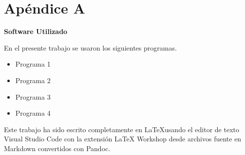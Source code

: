 \chapter*{Apéndice A} %

\linespread{1.3}

\noindent \textbf{\large{Software Utilizado}}
\ \newline
\par

En el presente trabajo se usaron los siguientes programas.

\begin{itemize}
	\item Programa 1
	\item Programa 2
	\item Programa 3
	\item Programa 4
	
\end{itemize}

Este trabajo ha sido escrito completamente en  \LaTeX usando el editor de texto Visual Studio Code con la extensión LaTeX Workshop desde archivos fuente en Markdown convertidos con Pandoc.
\clearpage %




\clearpage